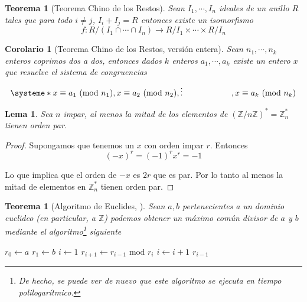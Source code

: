\documentclass[11pt, spanish]{report}
\makeatletter
\numberwithin{equation}{section}
\newtheorem{lema}[defin]{Lema}
\newtheorem{teo}[defin]{Teorema}
\newtheorem{corol}[defin]{Corolario}
\numberwithin{defin}{section}
\newenvironment{megaalgorithm}[1][htb]{%
    \renewcommand{\ALG@name}{Algoritmo}%
   \begin{algorithm}[#1]%
  }{\end{algorithm}}
\makeatother
\begin{document}
\begin{appendices}
\begin{teo}[Teorema Chino de los Restos]\label{teoChino}
Sean $I_1,\cdots,I_n$ ideales de un anillo $R$ tales que para todo $i\neq j$, $I_i+I_j=R$ entonces existe un isomorfismo
\begin{equation}
f:R/(I_1\cap\cdots\cap I_n)\rightarrow R/I_1\times\cdots\times R/I_n
\end{equation}
\end{teo}

\begin{corol}[Teorema Chino de los Restos, versión entera]\label{teoChinoEnt}
Sean $n_1,\cdots,n_k$ enteros coprimos dos a dos, entonces dados $k$ enteros $a_1,\cdots,a_k$ existe un entero $x$ que resuelve el sistema de congruencias
\begin{equation}
\systeme*{x \equiv a_1\ (\text{mod } n_1),x \equiv a_2\ (\text{mod } n_2),\vdots \hspace{2.07cm},x \equiv a_k\ (\text{mod } n_k)}
\end{equation}

\end{corol}

\begin{lema}\label{probPar}
Sea $n$ impar, al menos la mitad de los elementos de $(\mathbb{Z}/n\mathbb{Z})^*=\mathbb{Z}_n^*$ tienen orden par.
\end{lema}

\begin{proof}
Supongamos que tenemos un $x$ con orden impar $r$. Entonces
\begin{equation}
(-x)^r=(-1)^rx^r=-1
\end{equation}

Lo que implica que el orden de $-x$ es $2r$ que es par. Por lo tanto al menos la mitad de elementos en $\mathbb{Z}_n^*$ tienen orden par.
\end{proof}

\begin{teo}[Algoritmo de Euclides, \cite{shoup2009computational}] Sean $a,b$ pertenecientes a un dominio euclideo (en particular, a $\mathbb{Z}$) podemos obtener un máximo común divisor de $a$ y $b$ mediante el algoritmo\footnote{De hecho, se puede ver de nuevo que este algoritmo se ejecuta en tiempo polilogarítmico.} siguiente
\begin{megaalgorithm}
\caption{Algoritmo de Euclides}\label{euclidesAlg}
\begin{algorithmic}[1]
\State $r_0 \gets a$
\State $r_1 \gets b$
\State $i \gets 1$
\State $r_{i+1}\gets r_{i-1} \text{ mod } r_i$
\State $i \gets i+1$
\EndWhile
\Return $r_{i-1}$
\EndProcedure
\end{algorithmic}
\end{megaalgorithm}
\end{teo}


\end{appendices}
\end{document}
